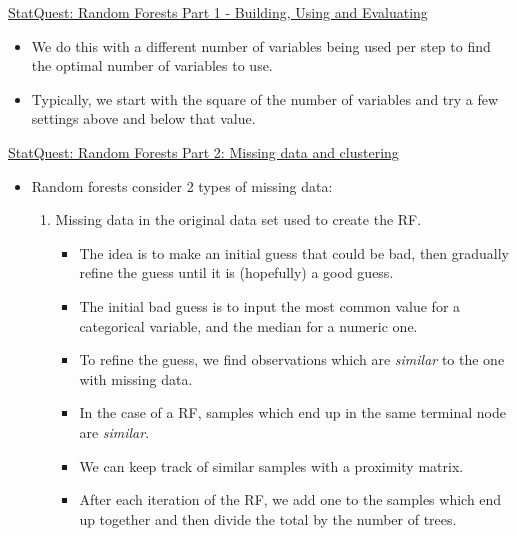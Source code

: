 \documentclass[12pt, titlepage, french]{report}
\begin{document}
\begin{YTB_SUMM_AUTO_NUMB}[label = {SQ-RF-PT1}]{\href{https://www.youtube.com/watch?v=J4Wdy0Wc_xQ&feature=youtu.be}{StatQuest: Random Forests Part 1 - Building, Using and Evaluating}}
\begin{itemize}[leftmargin = *]
\begin{itemize}[leftmargin = *]
		\item	A better terminology, however, would be the \textbf{Out-Of-Boot} dataset as it's the data which wasn't in the bootstrapped dataset.
		\item	It becomes our testing dataset with which we calculate the \textbf{Out-Of-Bag Error}.
	\end{itemize}
	\item	We do this with a different number of variables being used per step to find the optimal number of variables to use.
	\item	Typically, we start with the square of the number of variables and try a few settings above and below that value.
\end{itemize}
\end{YTB_SUMM_AUTO_NUMB}

\begin{YTB_SUMM_AUTO_NUMB}[label = {SQ-RF-PT2}]{\href{https://www.youtube.com/watch?v=sQ870aTKqiM&feature=youtu.be}{StatQuest: Random Forests Part 2: Missing data and clustering}}
\begin{itemize}[leftmargin = *]
	\item	Random forests consider 2 types of missing data:
		\begin{enumerate}[leftmargin = *]
		\item	Missing data in the original data set used to create the RF.
			\begin{itemize}[leftmargin = *]
			\item	The idea is to make an initial guess that could be bad, then gradually refine the guess until it is (hopefully) a good guess.
			\item	The initial bad guess is to input the most common value for a categorical variable, and the median for a numeric one.
			\item	To refine the guess, we find observations which are \textit{similar} to the one with missing data.
			\item	In the case of a RF, samples which end up in the same terminal node are \textit{similar}.
			\item	We can keep track of similar samples with a proximity matrix.
			\item	After each iteration of the RF, we add one to the samples which end up together and then divide the total by the number of trees.
			\begin{center}

\end{center}
\end{itemize}
\end{enumerate}
\end{itemize}
\end{YTB_SUMM_AUTO_NUMB}
\end{document}

